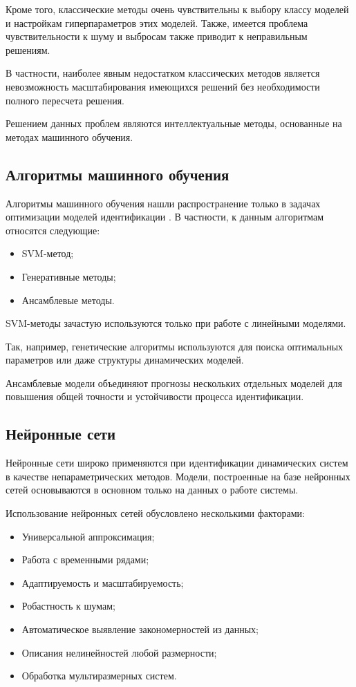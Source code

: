 Кроме того, классические методы очень чувствительны
к выбору классу моделей и настройкам гиперпараметров
этих моделей. Также, имеется проблема
чувствительности к шуму и выбросам также приводит к
неправильным решениям. 

В частности, наиболее явным недостатком классических
методов является невозможность масштабирования
имеющихся решений без необходимости полного
пересчета решения. 

Решением данных проблем являются интеллектуальные
методы, основанные на методах машинного обучения. 


\subsection{Алгоритмы машинного обучения}  

Алгоритмы машинного обучения нашли распространение только в задачах оптимизации
моделей идентификации . В частности, к данным алгоритмам относятся следующие:

\begin{itemize}
  \item SVM-метод;
  \item Генеративные методы;
  \item Ансамблевые методы.
\end{itemize}

SVM-методы зачастую используются только при работе с линейными моделями. 

Так, например, генетические алгоритмы используются для поиска оптимальных
параметров или даже структуры динамических моделей. 

Ансамблевые модели объединяют прогнозы нескольких отдельных моделей для
повышения общей точности и устойчивости процесса идентификации.

\subsection{Нейронные сети}

Нейронные сети широко применяются при идентификации динамических систем в
качестве непараметрических методов. Модели, построенные на базе нейронных сетей
основываются в основном только на данных о работе системы. 

Использование нейронных сетей обусловлено несколькими факторами:

\begin{itemize}
  \item Универсальной аппроксимация;
  \item Работа с временными рядами;
  \item Адаптируемость и масштабируемость;
  \item Робастность к шумам;
  \item Автоматическое выявление закономерностей из данных;
  \item Описания нелинейностей любой размерности;
  \item Обработка мультиразмерных систем.
\end{itemize}

